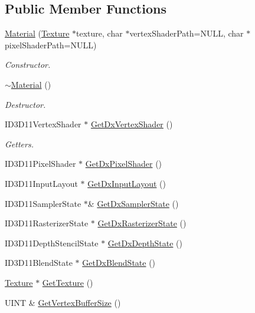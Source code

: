 \subsection*{Public Member Functions}
\begin{DoxyCompactItemize}
\item 
\hyperlink{class_material_a5c833e0bef6cb5afe3a697c3d2fd244a}{Material} (\hyperlink{class_texture}{Texture} $\ast$texture, char $\ast$vertex\+Shader\+Path=N\+U\+LL, char $\ast$pixel\+Shader\+Path=N\+U\+LL)
\begin{DoxyCompactList}\small\item\em Constructor. \end{DoxyCompactList}\item 
\hyperlink{class_material_a2c19452d71f54075df8f5405b03129f4}{$\sim$\+Material} ()
\begin{DoxyCompactList}\small\item\em Destructor. \end{DoxyCompactList}\item 
I\+D3\+D11\+Vertex\+Shader $\ast$ \hyperlink{class_material_ad0a3d883b957980fbc606bbbf9688d29}{Get\+Dx\+Vertex\+Shader} ()
\begin{DoxyCompactList}\small\item\em Getters. \end{DoxyCompactList}\item 
I\+D3\+D11\+Pixel\+Shader $\ast$ \hyperlink{class_material_a326382a866a4ad9f50c9d4a7e7b11f44}{Get\+Dx\+Pixel\+Shader} ()
\item 
I\+D3\+D11\+Input\+Layout $\ast$ \hyperlink{class_material_aab51c42d918132d3c50dea702cfb5d70}{Get\+Dx\+Input\+Layout} ()
\item 
I\+D3\+D11\+Sampler\+State $\ast$\& \hyperlink{class_material_a62903b3cc7607ee069f01ed31656a04d}{Get\+Dx\+Sampler\+State} ()
\item 
I\+D3\+D11\+Rasterizer\+State $\ast$ \hyperlink{class_material_a563a7e7b1561c84bc7e0a5535058d7a8}{Get\+Dx\+Rasterizer\+State} ()
\item 
I\+D3\+D11\+Depth\+Stencil\+State $\ast$ \hyperlink{class_material_adfed1977690dc11937f2fc2c181a61aa}{Get\+Dx\+Depth\+State} ()
\item 
I\+D3\+D11\+Blend\+State $\ast$ \hyperlink{class_material_a68d133ad75ced62ad4af090bd68bfe22}{Get\+Dx\+Blend\+State} ()
\item 
\hyperlink{class_texture}{Texture} $\ast$ \hyperlink{class_material_a84f3558e4be3b8ddc1c4b1e85d39d645}{Get\+Texture} ()
\item 
U\+I\+NT \& \hyperlink{class_material_afe7f86b971c00a0daa30839867539fb1}{Get\+Vertex\+Buffer\+Size} ()
\end{DoxyCompactItemize}
